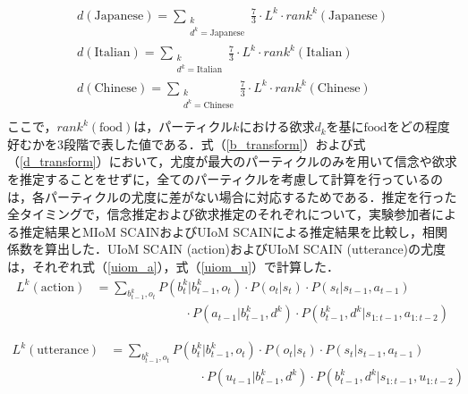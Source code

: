 \begin{equation}
  \begin{split}
  \label{d_transform}
  d(\mathrm{Japanese})= \sum_{\substack{k\\d^k=\mathrm{Japanese}}} \frac{7}{3}\cdot L^k \cdot rank^k({\mathrm{Japanese}})\\
  d(\mathrm{Italian})= \sum_{\substack{k\\d^k=\mathrm{Italian}}} \frac{7}{3}\cdot L^k \cdot rank^k({\mathrm{Italian}})\\
  d(\mathrm{Chinese})= \sum_{\substack{k\\d^k=\mathrm{Chinese}}} \frac{7}{3}\cdot L^k \cdot rank^k({\mathrm{Chinese}})\\
  \end{split}
\end{equation}
ここで，$rank^k(\mathrm{food})$は，パーティクル$k$における欲求$d_k$を基に$\mathrm{food}$をどの程度好むかを3段階で表した値である．式（\ref{b_transform}）および式（\ref{d_transform}）において，尤度が最大のパーティクルのみを用いて信念や欲求を推定することをせずに，全てのパーティクルを考慮して計算を行っているのは，各パーティクルの尤度に差がない場合に対応するためである．推定を行った全タイミングで，信念推定および欲求推定のそれぞれについて，実験参加者による推定結果とMIoM SCAINおよびUIoM SCAINによる推定結果を比較し，相関係数を算出した．UIoM SCAIN (action)およびUIoM SCAIN (utterance)の尤度は，それぞれ式（\ref{uiom_a}），式（\ref{uiom_u}）で計算した．
\begin{equation}
  \begin{split}
  \label{uiom_a}
  L^k({\mathrm{action}})&= \sum_{b_{t-1}^k,o_t}P(b_t^k|b_{t-1}^k,o_t)\cdot P(o_t|s_t)\cdot P(s_t|s_{t-1},a_{t-1})\\
  &\hspace{3cm}\cdot P(a_{t-1}|b_{t-1}^k,d^k)\cdot P(b_{t-1}^k,d^k|s_{1:t-1},a_{1:t-2})
  \end{split}
\end{equation}

\begin{equation}
  \begin{split}
  \label{uiom_u}
  L^k({\mathrm{utterance}})&= \sum_{b_{t-1}^k,o_t}P(b_t^k|b_{t-1}^k,o_t)\cdot P(o_t|s_t)\cdot P(s_t|s_{t-1},a_{t-1})\\
  &\hspace{3cm}\cdot P(u_{t-1}|b_{t-1}^k,d^k)\cdot P(b_{t-1}^k,d^k|s_{1:t-1},u_{1:t-2})
  \end{split}
\end{equation}


